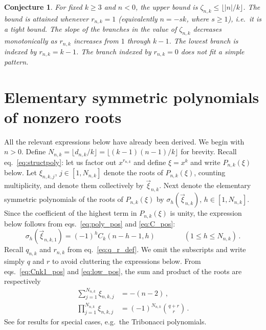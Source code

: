 \documentclass[review]{elsarticle}
\theoremstyle{plain}
\newtheorem{conjecture}[theorem]{Conjecture}
\begin{document}
\begin{conjecture}
For fixed $k\ge3$ and $n<0$, the upper bound is $\zeta_{n,k} \le \lfloor |n|/k\rfloor$.
The bound is attained whenever $r_{n,k}=1$ (equivalently $n=-sk$, where $s\ge1$), i.e.~it is a tight bound.
The slope of the branches in the value of $\zeta_{n,k}$ decreases monotonically as $r_{n,k}$ increases from $1$ through $k-1$.
The lowest branch is indexed by $r_{n,k}=k-1$.
The branch indexed by $r_{n,k}=0$ does not fit a simple pattern.
\end{conjecture}

\setcounter{equation}{0}
\section{Elementary symmetric polynomials of nonzero roots}\label{sec:elem_symm_poly}
All the relevant expressions below have already been derived.
We begin with $n>0$.
Define $N_{n,k} = \lfloor d_{n,k}/k\rfloor = \lfloor(k-1)(n-1)/k\rfloor$ for brevity.
Recall eq.~\eqref{eq:structpoly}:
let us factor out $x^{r_{n,k}}$ and define $\xi=x^k$ and write $P_{n,k}(\xi)$ below.
Let $\xi_{n,k,j}$, $j\in[1,N_{n,k}]$ denote the roots of $P_{n,k}(\xi)$, counting multiplicity,
and denote them collectively by $\vec{\xi}_{n,k}$.
Next denote the elementary symmetric polynomials of the roots of $P_{n,k}(\xi)$ by $\sigma_h(\vec{\xi}_{n,k})$, $h\in[1,N_{n,k}]$.
Since the coefficient of the highest term in $P_{n,k}(\xi)$ is unity, the expression below follows from eqs.~\eqref{eq:poly_pos} and \eqref{eq:C_pos}:
\begin{equation}
\sigma_h(\vec{\xi}_{n,k,1}) = (-1)^h C_k(n-h-1,h) \qquad\qquad (1 \le h \le N_{n,k})\,.
\end{equation}
Recall $q_{n,k}$ and $r_{n,k}$ from eq.~\eqref{eq:q_r_def}.
We omit the subscripts and write simply $q$ and $r$ to avoid cluttering the expressions below.
From eqs.~\eqref{eq:Cnk1_pos} and \eqref{eq:low_pos}, the sum and product of the roots are respectively 
\begin{align*}
  \sum_{j=1}^{N_{n,k}} \xi_{n,k,j} &= -(n-2) \,,
  \\
  \prod_{j=1}^{N_{n,k}} \xi_{n,k,j} &= (-1)^{N_{n,k}} \binom{q+r}{r} \,.
\end{align*}
See \cite{HeSimonRicci_zeros,Kaymak_Ozgur} for results for special cases, e.g.~the Tribonacci polynomials.
\end{document}
